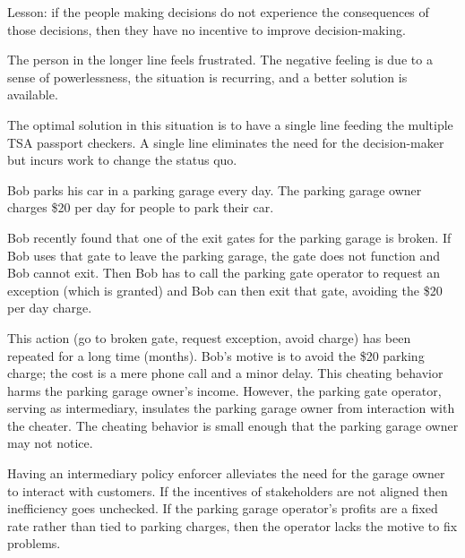 Lesson: if the people making decisions do not experience the consequences of those decisions, then they have no incentive to improve decision-making.

The person in the longer line feels frustrated. The negative feeling is due to a sense of powerlessness, the situation is recurring, and a better solution is available.

The optimal solution in this situation is to have a single line feeding the multiple TSA passport checkers. A single line eliminates the need for the decision-maker but incurs work to change the status quo.



\begin{mdframed}[frametitle={Parking Garage},frametitlerule=true,frametitlealignment=\centering]
Bob parks his car in a parking garage every day. 
The parking garage owner charges \$20 per day for people to park their car.

Bob recently found that one of the exit gates for the parking garage is broken. If Bob uses that gate to leave the parking garage, the gate does not function and Bob cannot exit. Then Bob has to call the parking gate operator to request an exception (which is granted) and Bob can then exit that gate, avoiding the \$20 per day charge.

This action (go to broken gate, request exception, avoid charge) has been repeated for a long time (months). Bob's motive is to avoid the \$20 parking charge; the cost is a mere phone call and a minor delay. This cheating behavior harms the parking garage owner's income. However, the parking gate operator, serving as intermediary, insulates the parking garage owner from interaction with the cheater. The cheating behavior is small enough that the parking garage owner may not notice.
\end{mdframed}

Having an intermediary policy enforcer alleviates the need for the garage owner to interact with customers. If the incentives of stakeholders are not aligned then inefficiency goes unchecked. If the parking garage operator's profits are a fixed rate rather than tied to parking charges, then the operator lacks the motive to fix problems. 